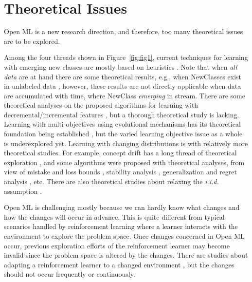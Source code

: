 \documentclass[review,11pt]{ReportTemplate}
\begin{document}
\section{Theoretical Issues}

Open ML is a new research direction, and therefore, too many theoretical issues are to be explored.

Among the four threads shown in Figure~\ref{fig:fig1}, current techniques for learning with emerging new classes are mostly based on heuristics \cite{Da:Yu:Zhou2014,Mu:Ting:Zhou2017,Mu:Zhu:Du:Lim:Zhou2017,Zhu:Ting:Zhou2018}. Note that when \textit{all data} are at hand there are some theoretical results, e.g., when NewClasses exist in unlabeled data \cite{Zhang:Zhao:Ma:Zhou2020,Liu:Garrepalli:Hendrycks:Fern2022}; however, these results are not directly applicable when data are accumulated with time, where NewClass \textit{emerging} in stream. There are some theoretical analyses on the proposed algorithms for learning with decremental/incremental features \cite{Hou:Zhou2018,Hou:Zhang:Zhou2017,Hou:Zhang:Zhou2021}, %
but a thorough theoretical study is lacking. Learning with multi-objectives using evolutional mechanisms has its theoretical foundation being established \cite{Zhou:Yu:Qian2019}, but the varied learning objective issue as a whole is underexplored yet. Learning with changing distributions is with relatively more theoretical studies. For example, concept drift has a long thread of theoretical exploration \cite{Helmbold:Long1994,Crammer:Mansour:EvenDar2010,Mohri:Medina2012}, and some algorithms were proposed with theoretical analyses, from view of mistake and loss bounds \cite{Kolter:Maloof2005}, stability analysis \cite{Harel:Mannor:ElYaniv2014}, generalization and regret analysis \cite{Zhao:Cai:Zhou2020}, etc. There are also theoretical studies about relaxing the \textit{i.i.d.} assumption \cite{Mohri:Rostamizadeh2008,Pentina:Lampert2015,Gao:Niu:Zhou2016}.

Open ML is challenging mostly because we can hardly know what changes and how the changes will occur in advance. This is quite different from typical scenarios handled by reinforcement learning \cite{Sutton:Barto2018,Majid:Saaybi:Rietbergen2021} where a learner interacts with the environment to explore the problem space. Once changes concerned in Open ML occur, previous exploration efforts of the reinforcement learner may become invalid since the problem space is altered by the changes. There are studies about adapting a reinforcement learner to a changed environment \cite{Zhang:Yu:Zhou2018,Chen:Yu:Da:Tan2018}, but the changes should not occur frequently or continuously.
\end{document}
